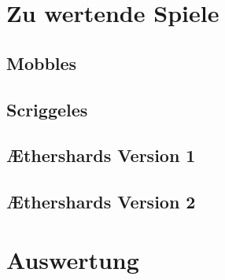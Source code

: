 \section{Zu wertende Spiele} 

\subsection{Mobbles} 

\subsection{Scriggeles} 

\subsection{Æthershards Version 1} 

\subsection{Æthershards Version 2} 

\section{Auswertung} 

